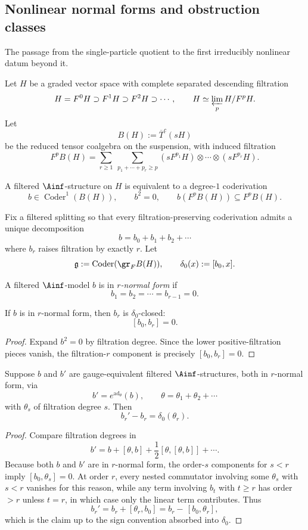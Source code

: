 \subsection{Nonlinear normal forms and obstruction classes}

The passage from the single-particle quotient to the first irreducibly nonlinear datum beyond it.

Let $H$ be a graded vector space with complete separated descending filtration
\[
H=F^0H\supset F^1H\supset F^2H\supset \cdots,
\qquad
H\simeq \varprojlim_p H/F^pH.
\]
Let
\[
B(H):=\overline{T}^c(sH)
\]
be the reduced tensor coalgebra on the suspension, with induced filtration
\[
F^pB(H)=
\sum_{r\ge1}\ \sum_{p_1+\cdots+p_r\ge p}
(sF^{p_1}H)\otimes\cdots\otimes(sF^{p_r}H).
\]

A filtered $\Ainf$-structure on $H$ is equivalent to a degree-$1$ coderivation
\[
b\in \operatorname{Coder}^1(B(H)),
\qquad
b^2=0,
\qquad
b(F^pB(H))\subseteq F^pB(H).
\]

Fix a filtered splitting so that every filtration-preserving coderivation admits a unique decomposition
\[
b=b_0+b_1+b_2+\cdots
\]
where $b_r$ raises filtration by exactly $r$. Let
\[
\mathfrak g:=\operatorname{Coder}(\gr_FB(H)),
\qquad
\delta_0(x):=[b_0,x].
\]

\begin{definition}
A filtered $\Ainf$-model $b$ is in \emph{$r$-normal form} if
\[
b_1=b_2=\cdots=b_{r-1}=0.
\]
\end{definition}

\begin{lemma}
If $b$ is in $r$-normal form, then $b_r$ is $\delta_0$-closed:
\[
[b_0,b_r]=0.
\]
\end{lemma}

\begin{proof}
Expand $b^2=0$ by filtration degree. Since the lower positive-filtration pieces vanish, the filtration-$r$ component is precisely $[b_0,b_r]=0$.
\end{proof}

\begin{lemma}
Suppose $b$ and $b'$ are gauge-equivalent filtered $\Ainf$-structures, both in $r$-normal form, via
\[
b'=e^{\operatorname{ad}_\theta}(b),
\qquad
\theta=\theta_1+\theta_2+\cdots
\]
with $\theta_s$ of filtration degree $s$. Then
\[
b_r'-b_r=\delta_0(\theta_r).
\]
\end{lemma}

\begin{proof}
Compare filtration degrees in
\[
b'=b+[\theta,b]+\frac12[\theta,[\theta,b]]+\cdots.
\]
Because both $b$ and $b'$ are in $r$-normal form, the order-$s$ components for $s<r$ imply $[b_0,\theta_s]=0$. At order $r$, every nested commutator involving some $\theta_s$ with $s<r$ vanishes for this reason, while any term involving $b_t$ with $t\ge r$ has order $>r$ unless $t=r$, in which case only the linear term contributes. Thus
\[
b_r'=b_r+[\theta_r,b_0]=b_r-\,[b_0,\theta_r],
\]
which is the claim up to the sign convention absorbed into $\delta_0$.
\end{proof}


